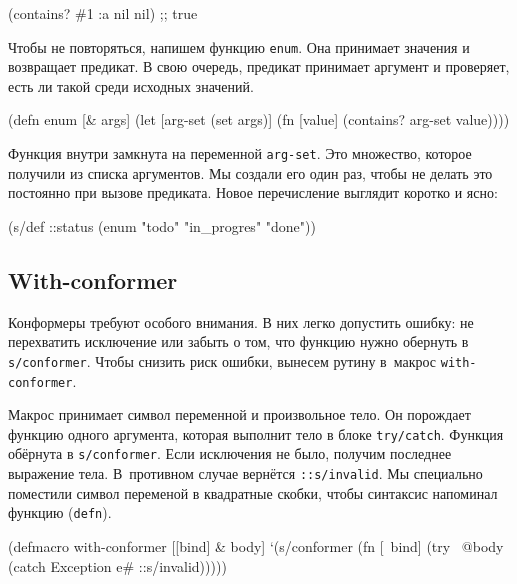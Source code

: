 \begin{english}
  \begin{clojure}
(contains? #{1 :a nil} nil) ;; true
  \end{clojure}
\end{english}

Чтобы не повторяться, напишем функцию \verb|enum|. Она принимает значения и
возвращает предикат. В свою очередь, предикат принимает аргумент и проверяет,
есть ли такой среди исходных значений.

\begin{english}
  \begin{clojure}
(defn enum [& args]
  (let [arg-set (set args)]
    (fn [value]
      (contains? arg-set value))))
  \end{clojure}
\end{english}

Функция внутри замкнута на переменной \verb|arg-set|. Это множество, которое
получили из списка аргументов. Мы создали его один раз, чтобы не делать это
постоянно при вызове предиката. Новое перечисление выглядит коротко и ясно:

\begin{english}
  \begin{clojure}
(s/def ::status
  (enum "todo"
        "in_progres"
        "done"))
  \end{clojure}
\end{english}

\subsection{With-conformer}


Конформеры требуют особого внимания. В них легко допустить ошибку: не
перехватить исключение или забыть о том, что функцию нужно обернуть в
\verb|s/conformer|. Чтобы снизить риск ошибки, вынесем рутину в~макрос
\verb|with-conformer|.

Макрос принимает символ переменной и произвольное тело. Он порождает функцию
одного аргумента, которая выполнит тело в блоке \verb|try/catch|. Функция
обёрнута в \verb|s/conformer|. Если исключения не было, получим последнее
выражение тела. В~противном случае вернётся \verb|::s/invalid|. Мы специально
поместили символ переменой в квадратные скобки, чтобы синтаксис напоминал
функцию (\verb|defn|).

\begin{english}
  \begin{clojure}
(defmacro with-conformer
  [[bind] & body]
  `(s/conformer
    (fn [~bind]
      (try
        ~@body
        (catch Exception e#
          ::s/invalid)))))
  \end{clojure}
\end{english}


